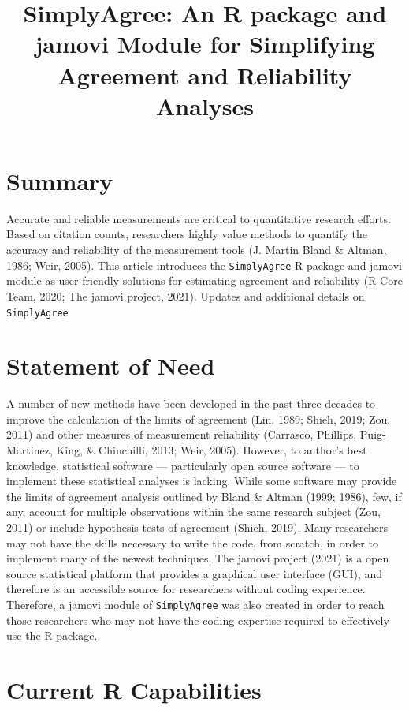 \documentclass[
]{article}
\title{SimplyAgree: An R package and jamovi Module for Simplifying
Agreement and Reliability Analyses}
\author{}
\date{\vspace{-2.5em}}
\begin{document}
\maketitle

\hypertarget{summary}{%
\section{Summary}\label{summary}}

Accurate and reliable measurements are critical to quantitative research
efforts. Based on citation counts, researchers highly value methods to
quantify the accuracy and reliability of the measurement tools (J.
Martin Bland \& Altman, 1986; Weir, 2005). This article introduces the
\texttt{SimplyAgree} R package and jamovi module as user-friendly
solutions for estimating agreement and reliability (R Core Team, 2020;
The jamovi project, 2021). Updates and additional details on
\texttt{SimplyAgree}

\hypertarget{statement-of-need}{%
\section{Statement of Need}\label{statement-of-need}}

A number of new methods have been developed in the past three decades to
improve the calculation of the limits of agreement (Lin, 1989; Shieh,
2019; Zou, 2011) and other measures of measurement reliability
(Carrasco, Phillips, Puig-Martinez, King, \& Chinchilli, 2013; Weir,
2005). However, to author's best knowledge, statistical software ---
particularly open source software --- to implement these statistical
analyses is lacking. While some software may provide the limits of
agreement analysis outlined by Bland \& Altman (1999; 1986), few, if
any, account for multiple observations within the same research subject
(Zou, 2011) or include hypothesis tests of agreement (Shieh, 2019). Many
researchers may not have the skills necessary to write the code, from
scratch, in order to implement many of the newest techniques. The jamovi
project (2021) is a open source statistical platform that provides a
graphical user interface (GUI), and therefore is an accessible source
for researchers without coding experience. Therefore, a jamovi module of
\texttt{SimplyAgree} was also created in order to reach those
researchers who may not have the coding expertise required to
effectively use the R package.

\hypertarget{current-r-capabilities}{%
\section{Current R Capabilities}\label{current-r-capabilities}}
\end{document}
